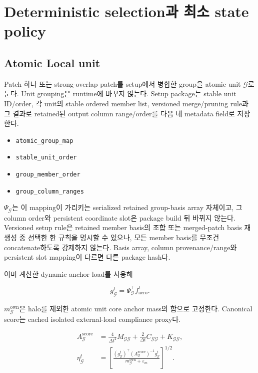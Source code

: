 \documentclass[11pt]{article}
\begin{document}
\section{Deterministic selection과 최소 state policy}

\subsection{Atomic Local unit}

Patch 하나 또는 strong-overlap patch를 setup에서 병합한 group을 atomic unit
\(\mathcal G\)로 둔다. Unit grouping은 runtime에 바꾸지 않는다.
Setup package는 stable unit ID/order, 각 unit의 stable ordered member list,
versioned merge/pruning rule과 그 결과로 retained된 output column range/order를
다음 네 metadata field로 저장한다.
\begin{itemize}
  \item \texttt{atomic\_group\_map}
  \item \texttt{stable\_unit\_order}
  \item \texttt{group\_member\_order}
  \item \texttt{group\_column\_ranges}
\end{itemize}
\(\Psi_{\mathcal G}\)는 이 mapping이 가리키는 serialized retained group-basis array 자체이고,
그 column order와 persistent coordinate slot은 package build 뒤 바뀌지 않는다.
Versioned setup rule은 retained member basis의 조합 또는 merged-patch basis 재생성 중 선택한 한 규칙을
명시할 수 있으나, 모든 member basis를 무조건 concatenate하도록 강제하지 않는다.
Basis array, column provenance/range와 persistent slot mapping이 다르면 다른 package hash다.

이미 계산한 dynamic anchor load를 사용해

\begin{equation}
  g_{\mathcal G}^t
  =
  \Psi_{\mathcal G}^\top
  f_{\mathrm{aero}}^t.
  \label{eq:minimal-local-drive}
\end{equation}

\(m_{\mathcal G}^{\mathrm{own}}\)은 halo를 제외한 atomic unit core anchor mass의 합으로 고정한다.
Canonical score는 cached isolated external-load compliance proxy다.

\begin{equation}
\begin{aligned}
  A_{\mathcal G}^{\mathrm{score}}
  &=
  \frac{4}{\Delta t^2}M_{\mathcal G\mathcal G}
  +\frac{2}{\Delta t}C_{\mathcal G\mathcal G}
  +K_{\mathcal G\mathcal G},\\
  \eta_{\mathcal G}^t
  &=
  \left[
  \frac{(g_{\mathcal G}^t)^\top
  (A_{\mathcal G}^{\mathrm{score}})^{-1}g_{\mathcal G}^t}
  {m_{\mathcal G}^{\mathrm{own}}+\varepsilon_m}
  \right]^{1/2}.
\end{aligned}
  \label{eq:minimal-selector}
\end{equation}
\end{document}
